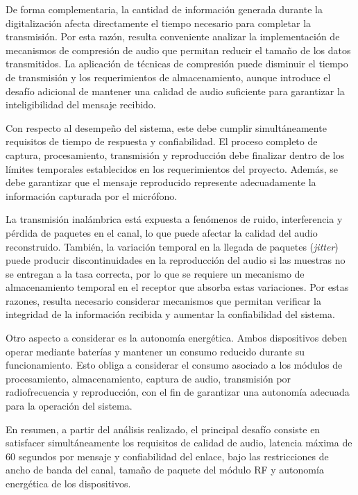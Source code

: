 De forma complementaria, la cantidad de información generada durante la digitalización afecta directamente el tiempo necesario para completar la transmisión.
Por esta razón, resulta conveniente analizar la implementación de mecanismos de compresión de audio que permitan reducir el tamaño de los datos transmitidos.
La aplicación de técnicas de compresión puede disminuir el tiempo de transmisión y los requerimientos de almacenamiento, aunque introduce el desafío adicional de mantener una calidad de audio suficiente para garantizar la inteligibilidad del mensaje recibido.

Con respecto al desempeño del sistema, este debe cumplir simultáneamente requisitos de tiempo de respuesta y confiabilidad.
El proceso completo de captura, procesamiento, transmisión y reproducción debe finalizar dentro de los límites temporales establecidos en los requerimientos del proyecto.
Además, se debe garantizar que el mensaje reproducido represente adecuadamente la información capturada por el micrófono.

La transmisión inalámbrica está expuesta a fenómenos de ruido, interferencia y pérdida de paquetes en el canal, lo que puede afectar la calidad del audio reconstruido.
También, la variación temporal en la llegada de paquetes (\textit{jitter}) puede producir discontinuidades en la reproducción del audio si las muestras no se entregan a la tasa correcta, por lo que se requiere un mecanismo de almacenamiento temporal en el receptor que absorba estas variaciones.
Por estas razones, resulta necesario considerar mecanismos que permitan verificar la integridad de la información recibida y aumentar la confiabilidad del sistema.

Otro aspecto a considerar es la autonomía energética.
Ambos dispositivos deben operar mediante baterías y mantener un consumo reducido durante su funcionamiento.
Esto obliga a considerar el consumo asociado a los módulos de procesamiento, almacenamiento, captura de audio, transmisión por radiofrecuencia y reproducción, con el fin de garantizar una autonomía adecuada para la operación del sistema.

En resumen, a partir del análisis realizado, el principal desafío consiste en satisfacer simultáneamente los requisitos de calidad de audio, latencia máxima de $60$ segundos por mensaje y confiabilidad del enlace, bajo las restricciones de ancho de banda del canal, tamaño de paquete del módulo RF y autonomía energética de los dispositivos.